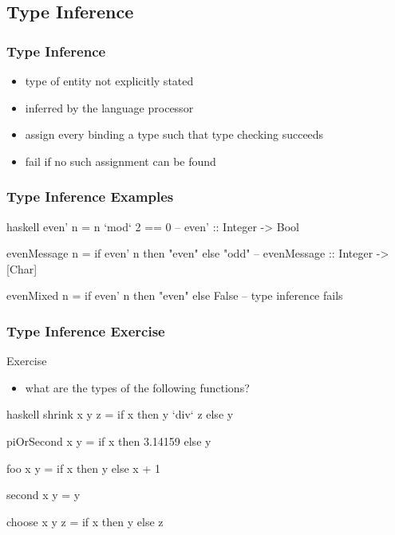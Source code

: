 \documentclass[dvipsnames]{beamer}
\theoremstyle{plain}
\begin{document}
\subsection{Type Inference}

\begin{frame}
  \frametitle{Type Inference}

  \begin{itemize}
    \item type of entity not explicitly stated
    \item inferred by the language processor

    \pause
    \medskip
    \item assign every binding a type such that type checking succeeds
    \item fail if no such assignment can be found
  \end{itemize}
\end{frame}

\begin{frame}[fragile]
  \frametitle{Type Inference Examples}

  \begin{example}[Haskell]
    \begin{pygments}{haskell}
even' n = n `mod` 2 == 0
-- even' :: Integer -> Bool

evenMessage n = if even' n then "even" else "odd"
-- evenMessage :: Integer -> [Char]

evenMixed n = if even' n then "even" else False
-- type inference fails
    \end{pygments}
  \end{example}
\end{frame}

\begin{frame}[fragile]
  \frametitle{Type Inference Exercise}

  \begin{block}{Exercise}
    \begin{itemize}
      \item what are the types of the following functions?
    \end{itemize}

    \medskip
    \begin{pygments}{haskell}
shrink x y z = if x then y `div` z else y

piOrSecond x y = if x then 3.14159 else y

foo x y = if x then y else x + 1

second x y = y

choose x y z = if x then y else z
    \end{pygments}
  \end{block}
\end{frame}
\end{document}

